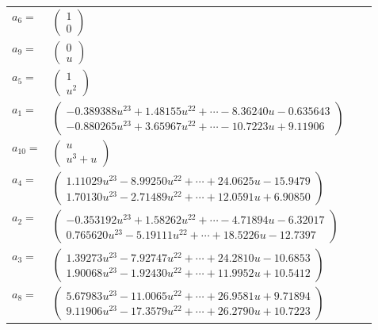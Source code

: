 \documentclass[1p]{elsarticle_modified}
\theoremstyle{definition}
\begin{document}
\begin{tabular}{m{7pt} m{180pt} m{7pt} m{180pt} }
\flushright $a_{6}=$&$\begin{pmatrix}1\\0\end{pmatrix}$ \\
\flushright $a_{9}=$&$\begin{pmatrix}0\\u\end{pmatrix}$ \\
\flushright $a_{5}=$&$\begin{pmatrix}1\\u^2\end{pmatrix}$ \\
\flushright $a_{1}=$&$\begin{pmatrix}-0.389388 u^{23}+1.48155 u^{22}+\cdots-8.36240 u-0.635643\\-0.880265 u^{23}+3.65967 u^{22}+\cdots-10.7223 u+9.11906\end{pmatrix}$ \\
\flushright $a_{10}=$&$\begin{pmatrix}u\\u^3+u\end{pmatrix}$ \\
\flushright $a_{4}=$&$\begin{pmatrix}1.11029 u^{23}-8.99250 u^{22}+\cdots+24.0625 u-15.9479\\1.70130 u^{23}-2.71489 u^{22}+\cdots+12.0591 u+6.90850\end{pmatrix}$ \\
\flushright $a_{2}=$&$\begin{pmatrix}-0.353192 u^{23}+1.58262 u^{22}+\cdots-4.71894 u-6.32017\\0.765620 u^{23}-5.19111 u^{22}+\cdots+18.5226 u-12.7397\end{pmatrix}$ \\
\flushright $a_{3}=$&$\begin{pmatrix}1.39273 u^{23}-7.92747 u^{22}+\cdots+24.2810 u-10.6853\\1.90068 u^{23}-1.92430 u^{22}+\cdots+11.9952 u+10.5412\end{pmatrix}$ \\
\flushright $a_{8}=$&$\begin{pmatrix}5.67983 u^{23}-11.0065 u^{22}+\cdots+26.9581 u+9.71894\\9.11906 u^{23}-17.3579 u^{22}+\cdots+26.2790 u+10.7223\end{pmatrix}$ \\

\end{tabular}
\end{document}
